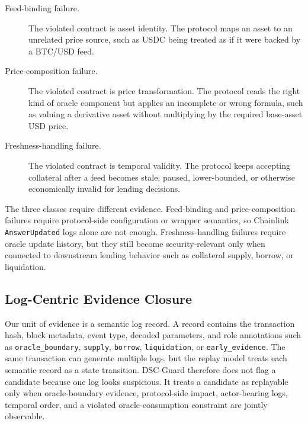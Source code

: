 \documentclass[final,5p]{elsarticle}
\newcommand{\code}[1]{\texttt{#1}}
\begin{document}
\begin{description}
    \item[Feed-binding failure.] The violated contract is asset identity. The protocol maps an asset to an unrelated price source, such as USDC being treated as if it were backed by a BTC/USD feed.
    \item[Price-composition failure.] The violated contract is price transformation. The protocol reads the right kind of oracle component but applies an incomplete or wrong formula, such as valuing a derivative asset without multiplying by the required base-asset USD price.
    \item[Freshness-handling failure.] The violated contract is temporal validity. The protocol keeps accepting collateral after a feed becomes stale, paused, lower-bounded, or otherwise economically invalid for lending decisions.
\end{description}

The three classes require different evidence.
Feed-binding and price-composition failures require protocol-side configuration or wrapper semantics, so Chainlink \code{AnswerUpdated} logs alone are not enough.
Freshness-handling failures require oracle update history, but they still become security-relevant only when connected to downstream lending behavior such as collateral supply, borrow, or liquidation.

\subsection{Log-Centric Evidence Closure}

Our unit of evidence is a semantic log record.
A record contains the transaction hash, block metadata, event type, decoded parameters, and role annotations such as \code{oracle\_boundary}, \code{supply}, \code{borrow}, \code{liquidation}, or \code{early\_evidence}.
The same transaction can generate multiple logs, but the replay model treats each semantic record as a state transition.
DSC-Guard therefore does not flag a candidate because one log looks suspicious.
It treats a candidate as replayable only when oracle-boundary evidence, protocol-side impact, actor-bearing logs, temporal order, and a violated oracle-consumption constraint are jointly observable.
\end{document}
